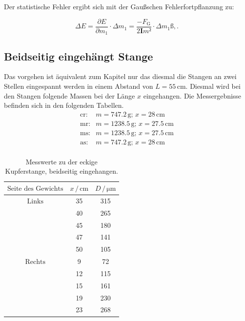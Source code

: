 Der statistische Fehler ergibt sich mit der Gaußschen Fehlerfortpflanzung zu: 

\begin{equation*}
\Delta E = \frac{\partial E}{\partial m_1}\cdot \Delta m_1 
= \frac{-F_\text{G}}{2\symbf{I}m²} \cdot \Delta m_1 ß, .
\end{equation*}

\subsection{Beidseitig eingehängt Stange}
Das vorgehen ist äquivalent zum Kapitel nur das diesmal die Stangen an zwei Stellen eingespannt werden in einem Abstand von $L = 55 \, \si{\centi\meter}$.
 Diesmal wird bei den Stangen folgende Massen bei der Länge $x$ eingehangen. Die Messergebnisse befinden sich in den folgenden Tabellen.
\begin{align*}
    \text{cr}:& m = 747.2 \, \si{\gram}; \,  x = 28 \, \si{\centi\meter} \\
    \text{mr}:& m = 1238.5 \, \si{\gram};\,  x = 27.5 \, \si{\centi\meter} \\
    \text{ms}:& m = 1238.5 \, \si{\gram};\,  x = 27.5 \, \si{\centi\meter} \\
    \text{as}:& m = 747.2 \, \si{\gram}; \,  x = 28 \, \si{\centi\meter}   \\
\end{align*}

\begin{table}
	\centering
	\caption{Messwerte zu der eckige Kupferstange, beidseitig eingehangen.} 
	\label{tab:vana} 
	\begin{tabular}{c c c}
	\toprule
	$\text{Seite des Gewichts} $&$x \, / \, \si{\centi\meter}$ & $D \, / \, \si{\micro\meter}$\\
	\midrule
    $\text{Links}$    &    35     &    315 \\
        &    40     &    265 \\
        &    45     &    180 \\
        &    47     &    141 \\
        &    50     &    105 \\
    $\text{Rechts}$    &    9       &    72 \\
        &    12      &   115 \\
        &    15      &   161 \\
        &    19      &   230 \\
        &    23      &   268 \\
\bottomrule
	\end{tabular}
\end{table}

